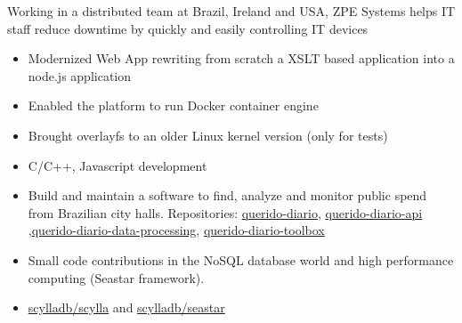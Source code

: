 \documentclass[10pt,a4paper]{altacv}
\begin{document}
Working in a distributed team at Brazil, Ireland and USA, ZPE Systems helps IT staff reduce downtime by quickly and easily controlling IT devices
\begin{itemize}
\item Modernized Web App rewriting from scratch  a XSLT based application into a node.js application 
\item Enabled the platform to run Docker container engine
\item Brought overlayfs to an older Linux kernel version (only for tests)
\item C/C++, Javascript development
\end{itemize}




\begin{itemize}
\item Build and maintain a software to find, analyze and monitor public spend from Brazilian city halls. Repositories: \href{https://github.com/okfn-brasil/querido-diario}{querido-diario}, \href{https://github.com/okfn-brasil/querido-diario-api}{querido-diario-api}
,\href{https://github.com/okfn-brasil/querido-diario-data-processing}{querido-diario-data-processing}, \href{https://github.com/okfn-brasil/querido-diario-toolbox/}{querido-diario-toolbox}

\end{itemize}


\begin{itemize}
\item Small code contributions in the NoSQL database world and high performance computing (Seastar framework).
\item \href{https://github.com/scylladb/scylla/commits/master?author=jvanz}{scylladb/scylla} and \href{https://github.com/scylladb/seastar/commits/master?author=jvanz}{scylladb/seastar}
\end{itemize}
\end{document}
